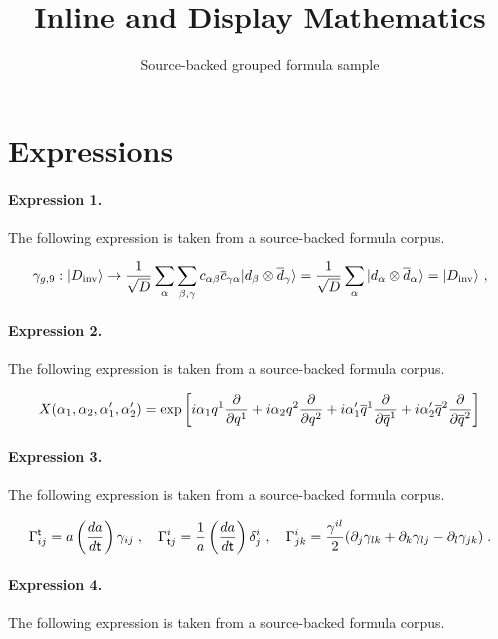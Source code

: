 \documentclass[11pt]{article}
\title{Inline and Display Mathematics}
\author{Source-backed grouped formula sample}
\date{}
\begin{document}
\maketitle
\section{Expressions}
\paragraph{Expression 1.} The following expression is taken from a source-backed formula corpus.

\begin{align*}\gamma_{g,9}:|D_{\rm inv}\rangle \rightarrow {1\over\sqrt{D}} \sum_\alpha \sum_{\beta,\gamma} c_{\alpha\beta} {\overline c}_{\gamma\alpha} |d_\beta\otimes{\overline d}_\gamma \rangle={1\over \sqrt{D}} \sum_\alpha |d_\alpha\otimes{\overline d}_\alpha\rangle=|D_{\rm inv}\rangle~,\end{align*}

\paragraph{Expression 2.} The following expression is taken from a source-backed formula corpus.

\begin{align*}X(\alpha_1,\alpha_2,\alpha'_1,\alpha'_2)=\exp \left[ i\alpha_1 q^1{\partial\over\partial q^1}+ i\alpha_2 q^2{\partial\over\partial q^2}+i\alpha'_1 \overline{q}^1{\partial\over\partial \overline{q}^1}+i\alpha'_2 \overline{q}^2{\partial\over\partial \overline{q}^2}\right]\end{align*}

\paragraph{Expression 3.} The following expression is taken from a source-backed formula corpus.

\begin{align*} \Gamma^{\sf t}_{ij} = a\left(\frac{da}{d{\sf t}}\right)\gamma_{ij}\;, ~~~\Gamma^{i}_{{\sf t}j} = \frac{1}{a}\left(\frac{da}{d{\sf t}}\right)\delta^i_j \;,~~~\Gamma^{i}_{jk}=\frac{\gamma^{il}}{2}(\partial_j\gamma_{lk}+\partial_k \gamma_{lj}-\partial_l\gamma_{jk}) \;.\end{align*}

\paragraph{Expression 4.} The following expression is taken from a source-backed formula corpus.
\end{document}

